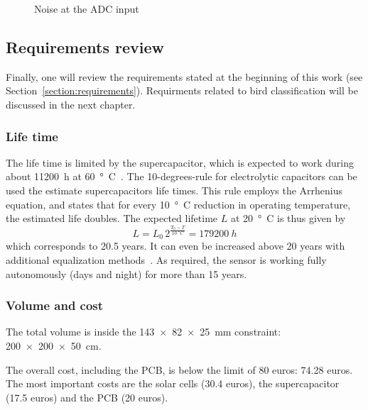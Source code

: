 \documentclass{EPL-master-thesis-covers-EN}
\begin{document}
\begin{figure}[H]
    \centering
    
    \caption{Noise at the ADC input}
    \label{fig:noise_sound}
\end{figure}




    
\subsection*{Requirements review}

Finally, one will review the requirements stated at the beginning of this work (see Section~\ref{section:requirements}). Requirments related to bird classification will be discussed in the next chapter.

\subsubsection*{Life time}

The life time is limited by the supercapacitor, which is expected to work during about \SI{11200}{h} at \SI{60}{\degree C}~\cite{Vishay}.   The 10-degrees-rule for electrolytic capacitors can be used the estimate supercapacitors life times. This rule employs the Arrhenius equation, and states that for every \SI{10}{\degree C} reduction in operating temperature, the estimated life doubles. The expected lifetime $L$ at \SI{20}{\degree C} is thus given by
\[
 L = L_0 \, 2^{\frac{T_0-T}{\SI{10}{\degree C}}} = \SI{179200}{h}
\]
which corresponds to 20.5 years. It can even be increased above 20 years with additional equalization methods~\cite{4494753}. As required, the sensor is working fully autonomously (days and night) for more than 15 years.

\subsubsection*{Volume and cost}

The total volume is inside the \SI{143 x 82 x 25}{mm} constraint: \SI{200 x 200 x 50}{cm}.

The overall cost, including the PCB, is below the limit of 80 euros: 74.28 euros. The most important costs are the solar cells (30.4 euros), the supercapacitor (17.5 euros) and the PCB (20 euros).
\end{document}
